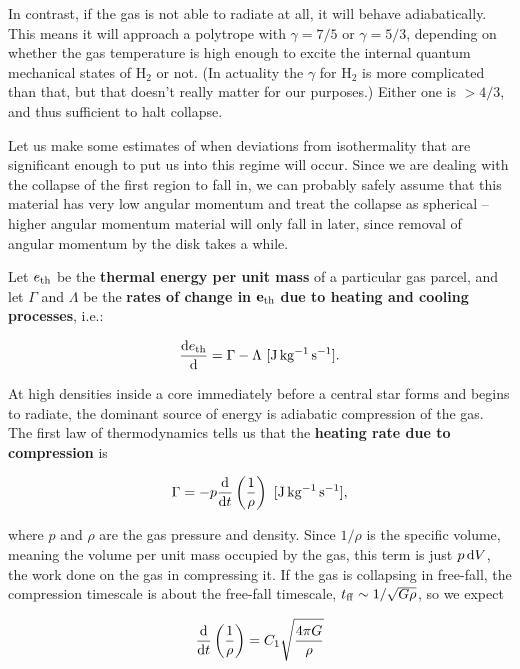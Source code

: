 \documentclass[a4paper,10pt]{article}
\begin{document}
{\noindent}In contrast, if the gas is not able to radiate at all, it will behave adiabatically. This means it will approach a polytrope with $\gamma=7/5$ or $\gamma=5/3$, depending on whether the gas temperature is high enough to excite the internal quantum mechanical states of H$_2$ or not. (In actuality the $\gamma$ for H$_2$ is more complicated than that, but that doesn't really matter for our purposes.) Either one is $>4/3$, and thus sufficient to halt collapse.

{\noindent}Let us make some estimates of when deviations from isothermality that are significant enough to put us into this regime will occur. Since we are dealing with the collapse of the first region to fall in, we can probably safely assume that this material has very low angular momentum and treat the collapse as spherical -- higher angular momentum material will only fall in later, since removal of angular momentum by the disk takes a while.

{\noindent}Let $e_{\rm th}$ be the \textbf{thermal energy per unit mass} of a particular gas parcel, and let $\Gamma$ and $\Lambda$ be the \textbf{rates of change in} $\mathbf{e_{\rm th}}$ \textbf{due to heating and cooling processes}, i.e.:

\begin{align*}
    \frac{{\rm d}e_{\rm th}}{{\rm d}} = \Gamma - \Lambda ~ [{\rm J\,kg^{-1}\,s^{-1}}].
\end{align*}

{\noindent}At high densities inside a core immediately before a central star forms and begins to radiate, the dominant source of energy is adiabatic compression of the gas. The first law of thermodynamics tells us that the \textbf{heating rate due to compression} is

\begin{align*}
    \Gamma = -p \frac{{\rm d}}{{\rm d}t} \left(\frac{1}{\rho}\right) ~ [{\rm J\,kg^{-1}\,s^{-1}}],
\end{align*}

{\noindent}where $p$ and $\rho$ are the gas pressure and density. Since $1/\rho$ is the specific volume, meaning the volume per unit mass occupied by the gas, this term is just $p\,{\rm d}V$, the work done on the gas in compressing it. If the gas is collapsing in free-fall, the compression timescale is about the free-fall timescale, $t_{\rm ff} \sim 1/\sqrt{G\rho}$, so we expect 

\begin{align*}
    \frac{{\rm d}}{{\rm d}t} \left(\frac{1}{\rho}\right) = C_1 \sqrt{\frac{4\pi G}{\rho}} 
\end{align*}
\end{document}
